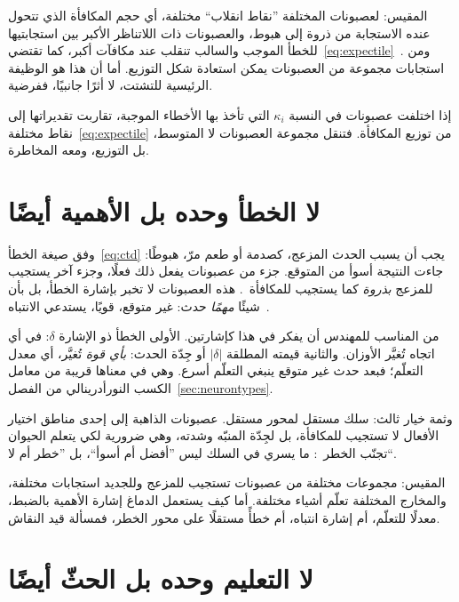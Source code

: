 المقيس: لعصبونات  المختلفة ”نقاط انقلاب“ مختلفة، أي حجم المكافأة الذي تتحول عنده الاستجابة من ذروة إلى هبوط، والعصبونات ذات اللاتناظر الأكبر بين استجابتيها للخطأ الموجب والسالب تنقلب عند مكافآت أكبر، كما تقتضي~\eqref{eq:expectile}~\cite{Dabney2020}. ومن استجابات مجموعة من العصبونات يمكن استعادة شكل التوزيع. أما أن هذا هو الوظيفة الرئيسية للتشتت، لا أثرًا جانبيًا، ففرضية.

\begin{keyblock}
\begin{proposition}
\label{prop:expectile}
إذا اختلفت عصبونات  في النسبة $\kappa_i$ التي تأخذ بها الأخطاء الموجبة، تقاربت تقديراتها إلى نقاط مختلفة~\eqref{eq:expectile} من توزيع المكافأة. فتنقل مجموعة العصبونات لا المتوسط، بل التوزيع، ومعه المخاطرة.
\end{proposition}
\end{keyblock}

\section{لا الخطأ وحده بل الأهمية أيضًا}

وفق صيغة الخطأ~\eqref{eq:ctd} يجب أن يسبب الحدث المزعج، كصدمة أو طعم مرّ، هبوطًا: جاءت النتيجة أسوأ من المتوقع. جزء من عصبونات  يفعل ذلك فعلًا، وجزء آخر يستجيب للمزعج \emph{بذروة} كما يستجيب للمكافأة~\cite{Matsumoto2009}. هذه العصبونات لا تخبر بإشارة الخطأ، بل بأن شيئًا \emph{مهمًا} حدث: غير متوقع، قويًا، يستدعي الانتباه~\cite{BrombergMartin2010}.

من المناسب للمهندس أن يفكر في هذا كإشارتين. الأولى الخطأ ذو الإشارة $\delta$: في أي اتجاه تُغيَّر الأوزان. والثانية قيمته المطلقة $|\delta|$ أو جِدّة الحدث: \emph{بأي قوة} تُغيَّر، أي معدل التعلّم؛ فبعد حدث غير متوقع ينبغي التعلّم أسرع. وهي في معناها قريبة من معامل الكسب النورأدرينالي من الفصل~\ref{sec:neurontypes}.

وثمة خيار ثالث: سلك مستقل لمحور مستقل. عصبونات  الذاهبة إلى إحدى مناطق اختيار الأفعال لا تستجيب للمكافأة، بل لجِدّة المنبّه وشدته، وهي ضرورية لكي يتعلم الحيوان تجنّب الخطر~\cite{Menegas2018}: ما يسري في السلك ليس ”أفضل أم أسوأ“، بل ”خطر أم لا“.

المقيس: مجموعات مختلفة من عصبونات  تستجيب للمزعج وللجديد استجابات مختلفة، والمخارج المختلفة تعلّم أشياء مختلفة. أما كيف يستعمل الدماغ إشارة الأهمية بالضبط، معدلًا للتعلّم، أم إشارة انتباه، أم خطأً مستقلًا على محور الخطر، فمسألة قيد النقاش.

\section{لا التعليم وحده بل الحثّ أيضًا}


